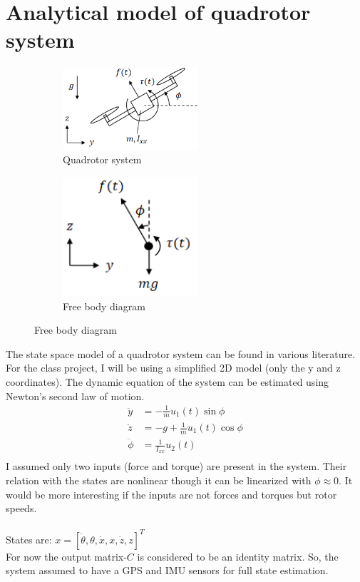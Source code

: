 \documentclass[12pt]{article}
\begin{document}
{\section*{Analytical model of quadrotor system}
\begin{figure}[h!]
    \begin{subfigure}[t]{0.5\textwidth}
        \centering
        \includegraphics[width=5cm]{figures/model_diagram.png}
        \caption{Quadrotor system \cite{model_diagram}}
        \label{fig:01}
    \end{subfigure}
    \hfill
    \begin{subfigure}[t]{0.5\textwidth}
        \centering
        \includegraphics[width=5cm]{figures/free_body_diagram.png}
        \caption{Free body diagram \cite{model_diagram}}
        \label{fig:02}
    \end{subfigure}
\end{figure}

The state space model of a quadrotor system can be found in various literature\cite{K2019}\cite{Schreier2012}. For the class project, I will be using a simplified 2D model (only the y and z coordinates). The dynamic equation of the system can be estimated using Newton's second law of motion.
\begin{align*}
    \ddot{y} &= -\frac{1}{m}u_1(t) \sin{\phi} \\
    \ddot{z} &= -g + \frac{1}{m}u_1(t) \cos{\phi} \\ 
    \ddot{\phi} &= \frac{1}{I_{xx}}u_2(t) \\
\end{align*}
I assumed only two inputs (force and torque) are present in the system. Their relation with the states are nonlinear though it can be linearized with $\phi \approx 0$. It would be more interesting if the inputs are not forces and torques but rotor speeds. \\\\
States are: $x = [\dot{\theta}, \theta, \dot{x}, x, \dot{z}, z]^T$ \\
For now the output matrix-$C$ is considered to be an identity matrix. So, the system assumed to have a GPS and IMU sensors for full state estimation.

}
\end{document}
